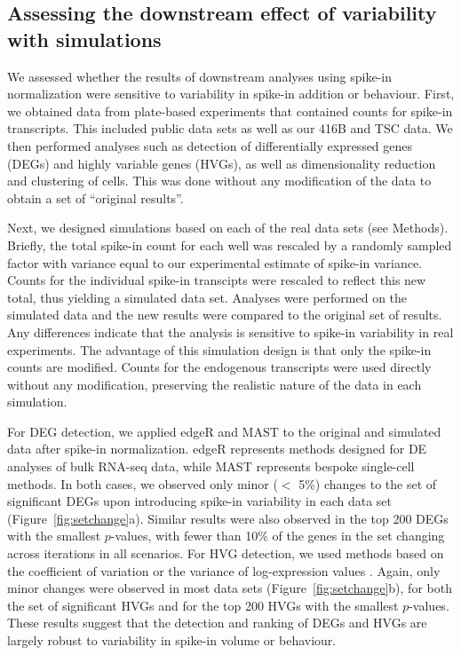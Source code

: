 \documentclass{article}
\begin{document}
\subsection{Assessing the downstream effect of variability with simulations}
We assessed whether the results of downstream analyses using spike-in normalization were sensitive to variability in spike-in addition or behaviour.
First, we obtained data from plate-based experiments that contained counts for spike-in transcripts.
This included public data sets \cite{segerstople2016single,islam2011characterization} as well as our 416B and TSC data.
We then performed analyses such as detection of differentially expressed genes (DEGs) and highly variable genes (HVGs), as well as dimensionality reduction and clustering of cells.
This was done without any modification of the data to obtain a set of ``original results''.

Next, we designed simulations based on each of the real data sets (see Methods).
Briefly, the total spike-in count for each well was rescaled by a randomly sampled factor with variance equal to our experimental estimate of spike-in variance.
Counts for the individual spike-in transcipts were rescaled to reflect this new total, thus yielding a simulated data set.
Analyses were performed on the simulated data and the new results were compared to the original set of results.
Any differences indicate that the analysis is sensitive to spike-in variability in real experiments.
The advantage of this simulation design is that only the spike-in counts are modified.
Counts for the endogenous transcripts were used directly without any modification, preserving the realistic nature of the data in each simulation.

For DEG detection, we applied edgeR \cite{robinson2010edgeR} and MAST \cite{finak2015mast} to the original and simulated data after spike-in normalization.
edgeR represents methods designed for DE analyses of bulk RNA-seq data, while MAST represents bespoke single-cell methods.
In both cases, we observed only minor ($<$ 5\%) changes to the set of significant DEGs upon introducing spike-in variability in each data set (Figure~\ref{fig:setchange}a). 
Similar results were also observed in the top 200 DEGs with the smallest $p$-values, with fewer than 10\% of the genes in the set changing across iterations in all scenarios.
For HVG detection, we used methods based on the coefficient of variation \cite{brennecke2013accounting} or the variance of log-expression values \cite{lun2016stepbystep}.
Again, only minor changes were observed in most data sets (Figure~\ref{fig:setchange}b), for both the set of significant HVGs and for the top 200 HVGs with the smallest $p$-values.
These results suggest that the detection and ranking of DEGs and HVGs are largely robust to variability in spike-in volume or behaviour.
\end{document}
